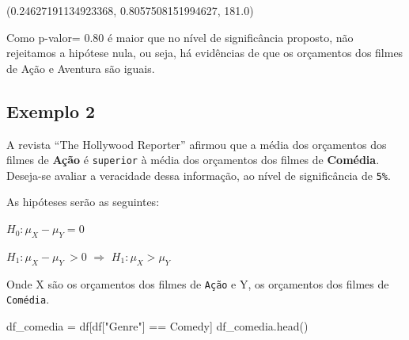 \documentclass[
  letterpaper,
  DIV=11,
  numbers=noendperiod]{scrreprt}
\newenvironment{Shaded}{\begin{snugshade}}{\end{snugshade}}
\newcommand{\DecValTok}[1]{\textcolor[rgb]{0.68,0.00,0.00}{#1}}
\newcommand{\NormalTok}[1]{\textcolor[rgb]{0.00,0.23,0.31}{#1}}
\newcommand{\OperatorTok}[1]{\textcolor[rgb]{0.37,0.37,0.37}{#1}}
\newcommand{\StringTok}[1]{\textcolor[rgb]{0.13,0.47,0.30}{#1}}
\begin{document}
\begin{Shaded}
\end{Shaded}

\begin{tcolorbox}[enhanced jigsaw, breakable, leftrule=.75mm, left=2mm, opacityback=0, bottomrule=.15mm, toprule=.15mm, rightrule=.15mm, arc=.35mm, colback=white]

(0.24627191134923368, 0.8057508151994627, 181.0)

\end{tcolorbox}

Como p-valor= 0.80 é maior que no nível de significância proposto, não
rejeitamos a hipótese nula, ou seja, há evidências de que os orçamentos
dos filmes de Ação e Aventura são iguais.

\hypertarget{exemplo-2-4}{%
\subsection{Exemplo 2}\label{exemplo-2-4}}

A revista ``The Hollywood Reporter'' afirmou que a média dos orçamentos
dos filmes de \textbf{Ação} é \texttt{superior} à média dos orçamentos
dos filmes de \textbf{Comédia}. Deseja-se avaliar a veracidade dessa
informação, ao nível de significância de \texttt{5\%}.

As hipóteses serão as seguintes:

\(H_{0} : \mu_{X} - \mu_{Y} = 0\)

\(H_{1} : \mu_{X} - \mu_{Y}\ > 0\) \(\Rightarrow\)
\(H_{1} : \mu_{X} > \mu_{Y}\)

Onde X são os orçamentos dos filmes de \texttt{Ação} e Y, os orçamentos
dos filmes de \texttt{Comédia}.

\begin{Shaded}
\begin{Highlighting}[]
\NormalTok{df\_comedia }\OperatorTok{=}\NormalTok{ df[df[}\StringTok{"Genre"}\NormalTok{] }\OperatorTok{==} \StringTok{\textquotesingle{}Comedy\textquotesingle{}}\NormalTok{]}
\NormalTok{df\_comedia.head()}
\end{Highlighting}
\end{Shaded}
\end{document}

